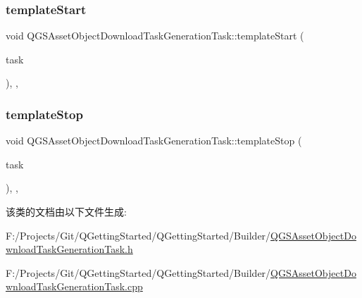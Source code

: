 \mbox{\label{class_q_g_s_asset_object_download_task_generation_task_a87ab572bd8b6f20986871b76418e6d20}} 
\subsubsection{\texorpdfstring{template\+Start}{templateStart}}
{\footnotesize\ttfamily void Q\+G\+S\+Asset\+Object\+Download\+Task\+Generation\+Task\+::template\+Start (\begin{DoxyParamCaption}\item[{\mbox{\hyperlink{class_q_g_s_task}{Q\+G\+S\+Task}} $\ast$}]{task }\end{DoxyParamCaption})\hspace{0.3cm}{\ttfamily [protected]}, {\ttfamily [virtual]}, {\ttfamily [slot]}}

\mbox{\label{class_q_g_s_asset_object_download_task_generation_task_ac7c64f2aa05cb50df9a5c50bbc0b5ee7}} 
\subsubsection{\texorpdfstring{template\+Stop}{templateStop}}
{\footnotesize\ttfamily void Q\+G\+S\+Asset\+Object\+Download\+Task\+Generation\+Task\+::template\+Stop (\begin{DoxyParamCaption}\item[{\mbox{\hyperlink{class_q_g_s_task}{Q\+G\+S\+Task}} $\ast$}]{task }\end{DoxyParamCaption})\hspace{0.3cm}{\ttfamily [protected]}, {\ttfamily [virtual]}, {\ttfamily [slot]}}



该类的文档由以下文件生成\+:\begin{DoxyCompactItemize}
\item 
F\+:/\+Projects/\+Git/\+Q\+Getting\+Started/\+Q\+Getting\+Started/\+Builder/\mbox{\hyperlink{_q_g_s_asset_object_download_task_generation_task_8h}{Q\+G\+S\+Asset\+Object\+Download\+Task\+Generation\+Task.\+h}}\item 
F\+:/\+Projects/\+Git/\+Q\+Getting\+Started/\+Q\+Getting\+Started/\+Builder/\mbox{\hyperlink{_q_g_s_asset_object_download_task_generation_task_8cpp}{Q\+G\+S\+Asset\+Object\+Download\+Task\+Generation\+Task.\+cpp}}\end{DoxyCompactItemize}
